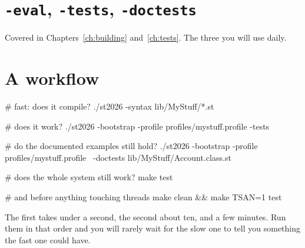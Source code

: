 \section{\texttt{-eval}, \texttt{-tests}, \texttt{-doctests}}

Covered in Chapters~\ref{ch:building} and~\ref{ch:tests}. The three you will
use daily.

\section{A workflow}

\begin{sh}
# fast: does it compile?
./st2026 -syntax lib/MyStuff/*.st

# does it work?
./st2026 -bootstrap -profile profiles/mystuff.profile -tests

# do the documented examples still hold?
./st2026 -bootstrap -profile profiles/mystuff.profile \
       -doctests lib/MyStuff/Account.class.st

# does the whole system still work?
make test

# and before anything touching threads
make clean && make TSAN=1 test
\end{sh}

The first takes under a second, the second about ten, and  a few
minutes. Run them in that order and you will rarely wait for the slow one to
tell you something the fast one could have.

